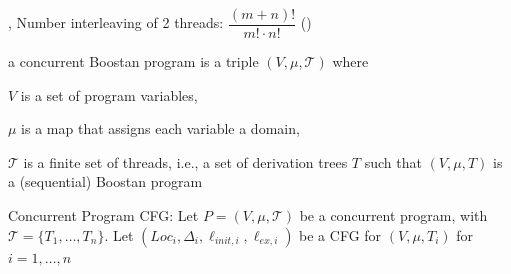 \documentclass[landscape, a4paper]{article}
\begin{document}
\begin{minipage}[t]{0.2\linewidth}
	\begin{betterlist}
		\item {}, Number interleaving of 2 threads: $\dfrac{(m+n)!}{m!\cdot n!} $ ()
    \item \color{orange}a \alert{ concurrent Boostan program}  is a triple $(V , \mu , \mathcal{T})$ where
		\begin{betterlist}
			\item $V$ is a set of program variables,
			\item $\mu$ is a map that assigns each variable a domain,
			\item $\mathcal{T}$ is a finite set of threads, i.e., a set of derivation trees $T$ such that $(V , \mu , T)$ is a (sequential) Boostan program
      \end{betterlist}\color{black}
    \item \color{orange}\alert{Concurrent Program CFG:} Let $P = (V , \mu , \mathcal{T} )$ be a concurrent program, with $\mathcal{T} = \{ T_1,\ldots, T_n\}$. Let $(Loc_i, \Delta_i, \ell_{init,i}, \ell_{ex,i})$ be a CFG for $(V, \mu , T_i)$ for $i = 1, \ldots, n$


\end{betterlist}
\end{minipage}
\end{document}
